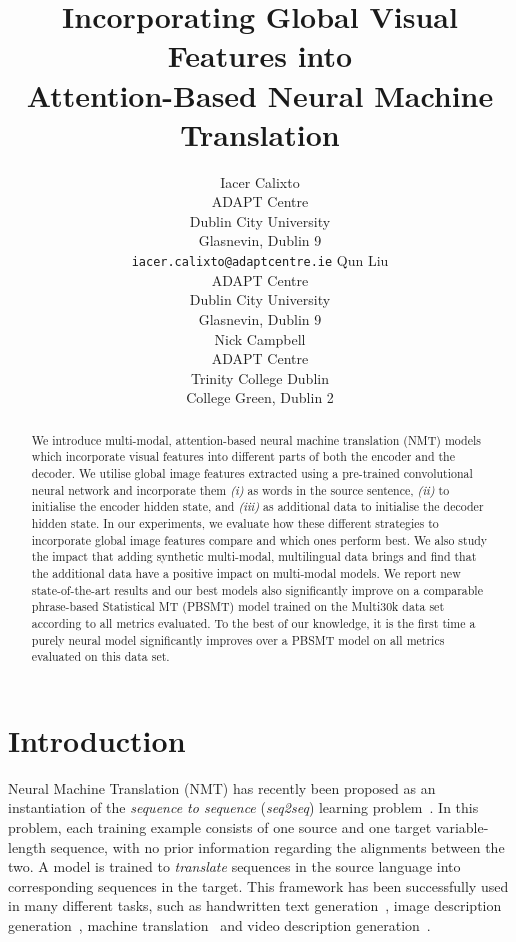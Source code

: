 \documentclass[11pt,twocolumn]{article}
\title{Incorporating Global Visual Features into\\Attention-Based Neural Machine Translation}
\author{Iacer Calixto\\
	    ADAPT Centre\\
	    Dublin City University\\
	    Glasnevin, Dublin 9\\
	    {\tt\small iacer.calixto@adaptcentre.ie}
	  \And
	Qun Liu\\
	ADAPT Centre\\
  	Dublin City University\\
  	Glasnevin, Dublin 9\\
\And
	Nick Campbell\\
	ADAPT Centre\\
  	Trinity College Dublin\\
  	College Green, Dublin 2\\
}
\date{}
\begin{document}
\maketitle

\begin{abstract}
 We introduce multi-modal, attention-based neural machine translation (NMT) models
 which incorporate visual features into different parts of both the encoder and the decoder.
 We utilise global image features extracted using a pre-trained convolutional neural network and incorporate them \textit{(i)} as words in the source sentence, \textit{(ii)} to initialise the encoder hidden state, and \textit{(iii)} as additional data to initialise the decoder hidden state.
In our experiments, we evaluate how these different strategies to incorporate global image features compare and which ones perform best.
 We also study the impact that adding synthetic multi-modal, multilingual data brings and find that the additional data have a positive impact on multi-modal models.
We report new state-of-the-art results and our best models also significantly improve on a comparable phrase-based Statistical MT (PBSMT) model trained on the Multi30k data set according to all metrics evaluated.
 To the best of our knowledge, it is the first time a purely neural model significantly improves over a PBSMT model on all metrics evaluated on this data set.
\end{abstract}

\setlength{\belowdisplayskip}{1.0pt} \setlength{\belowdisplayshortskip}{1.0pt}
\setlength{\abovedisplayskip}{1.0pt} \setlength{\abovedisplayshortskip}{1.0pt}
\setlength{\intextsep}{1.5pt}

\section{Introduction}
\label{sec:intro}

Neural Machine Translation (NMT) has recently been proposed as an instantiation of the \emph{sequence to sequence} (\emph{seq2seq}) learning problem~\cite{KalchbrennerBlunsom2013,Choetal2014,SutskeverVinyalsLe2014}.
In this problem, each training example consists of one source and one target variable-length sequence, with no prior information regarding the alignments between the two.
A model is trained to \emph{translate} sequences in the source language into corresponding sequences in the target.
This framework has been successfully used in many different tasks, such as
handwritten text generation~\cite{Graves2013},
image description generation~\cite{Hodoshetal2013,Kirosetal2014b,Maoetal2014,Elliottetal2015,KarpathyFeiFei2015,Vinyalsetal2014},
machine translation~\cite{Choetal2014,SutskeverVinyalsLe2014}
and
video description generation~\cite{Donahueetal2015,Venugopalanetal2015}.
\end{document}
